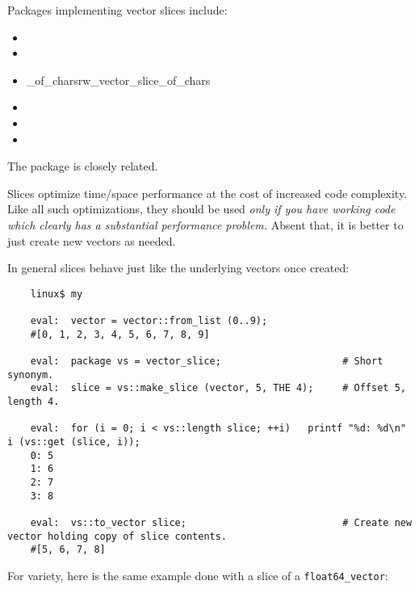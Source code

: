 Packages implementing vector slices include:
\begin{itemize}
\item {}
\item {}
\item {}\_of\_chars{rw\_vector\_slice\_of\_chars}
\item {}
\item {}
\item {}
\end{itemize}

The  package is closely related.

Slices optimize time/space performance at the cost of increased code 
complexity.  Like all such optimizations, they should be used {\it only 
if you have working code which clearly has a substantial performance problem.} 
Absent that, it is better to just create new vectors as needed.

In general slices behave just like the underlying vectors once created:

\begin{verbatim}
    linux$ my

    eval:  vector = vector::from_list (0..9);
    #[0, 1, 2, 3, 4, 5, 6, 7, 8, 9]

    eval:  package vs = vector_slice;                     # Short synonym.
    eval:  slice = vs::make_slice (vector, 5, THE 4);     # Offset 5, length 4.

    eval:  for (i = 0; i < vs::length slice; ++i)   printf "%d: %d\n" i (vs::get (slice, i));
    0: 5
    1: 6
    2: 7
    3: 8

    eval:  vs::to_vector slice;                           # Create new vector holding copy of slice contents.
    #[5, 6, 7, 8]
\end{verbatim}

For variety, here is the same example done with a slice of a {\tt float64\_vector}:

